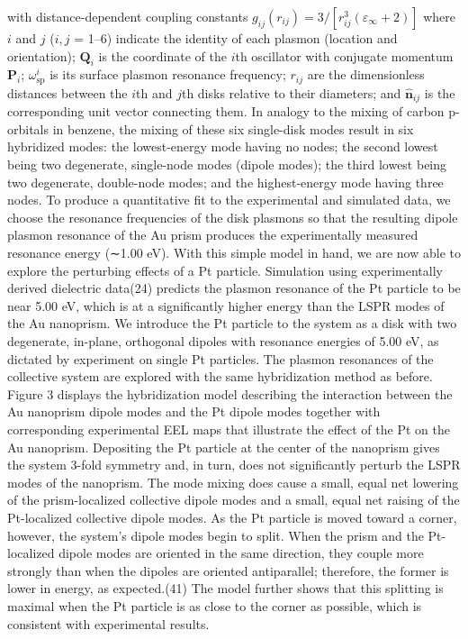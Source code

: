 \documentclass [11pt, proquest] {uwthesis}[2016/11/22]
\begin{document}
with distance-dependent coupling constants $g_{ij}(r_{ij}) = 3/[r_{ij}^3(\varepsilon_{\infty} + 2)]$ where $i$ and $j$ ($i, j$ = 1–6) indicate the identity of each plasmon (location and orientation); $\textbf{Q}_i$ is the coordinate of the $i$th oscillator with conjugate momentum $\textbf{P}_i$; $\omega_{\textrm{sp}}^i$ is its surface plasmon resonance frequency; $r_{ij}$ are the dimensionless distances between the $i$th and $j$th disks relative to their diameters; and $\hat{\textbf{n}}_{ij}$ is the corresponding unit vector connecting them.
In analogy to the mixing of carbon p-orbitals in benzene, the mixing of these six single-disk modes result in six hybridized modes: the lowest-energy mode having no nodes; the second lowest being two degenerate, single-node modes (dipole modes); the third lowest being two degenerate, double-node modes; and the highest-energy mode having three nodes. To produce a quantitative fit to the experimental and simulated data, we choose the resonance frequencies of the disk plasmons so that the resulting dipole plasmon resonance of the Au prism produces the experimentally measured resonance energy (∼1.00 eV).
With this simple model in hand, we are now able to explore the perturbing effects of a Pt particle. Simulation using experimentally derived dielectric data(24) predicts the plasmon resonance of the Pt particle to be near 5.00 eV, which is at a significantly higher energy than the LSPR modes of the Au nanoprism. We introduce the Pt particle to the system as a disk with two degenerate, in-plane, orthogonal dipoles with resonance energies of 5.00 eV, as dictated by experiment on single Pt particles. The plasmon resonances of the collective system are explored with the same hybridization method as before.
Figure 3 displays the hybridization model describing the interaction between the Au nanoprism dipole modes and the Pt dipole modes together with corresponding experimental EEL maps that illustrate the effect of the Pt on the Au nanoprism. Depositing the Pt particle at the center of the nanoprism gives the system 3-fold symmetry and, in turn, does not significantly perturb the LSPR modes of the nanoprism. The mode mixing does cause a small, equal net lowering of the prism-localized collective dipole modes and a small, equal net raising of the Pt-localized collective dipole modes. As the Pt particle is moved toward a corner, however, the system’s dipole modes begin to split. When the prism and the Pt-localized dipole modes are oriented in the same direction, they couple more strongly than when the dipoles are oriented antiparallel; therefore, the former is lower in energy, as expected.(41) The model further shows that this splitting is maximal when the Pt particle is as close to the corner as possible, which is consistent with experimental results.
\end{document}
